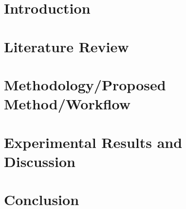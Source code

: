 \documentclass[12pt,a4paper]{report}
\begin{document}

\clearpage
{}


\clearpage


\clearpage


\clearpage

\renewcommand{\contentsname}{Table of Contents}
\tableofcontents
\clearpage

\listoffigures
\clearpage

\listoftables
\clearpage


\clearpage


\chapter{Introduction}\label{chapter:introduction}


\chapter{Literature Review}


\chapter{Methodology/Proposed Method/Workflow}


\chapter{Experimental Results and Discussion}


\chapter{Conclusion}


\clearpage
{}
{}
\nocite{*}



\appendix

\end{document}
